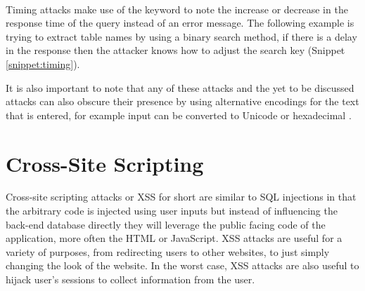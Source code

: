 \begin{codesnippet}
	\vspace{0.25in}
	\noindent
	\\
	\label{snippet:inference}
	\vspace{0.25in}
\end{codesnippet}

Timing attacks make use of the  keyword to note the increase or decrease in the response time of the query instead of an error message.  The following example is trying to extract table names by using a binary search method, if there is a delay in the response then the attacker knows how to adjust the search key (Snippet \ref{snippet:timing}).

\begin{codesnippet}
	\vspace{0.25in}
	\noindent
	\label{snippet:timing}
	\vspace{0.25in}
\end{codesnippet}

It is also important to note that any of these attacks and the yet to be discussed attacks can also obscure their presence by using alternative encodings for the text that is entered, for example input can be converted to Unicode or hexadecimal \cite{aClassificationOfSQL}.

\section{Cross-Site Scripting}\label{sec:xssExplanation}

Cross-site scripting attacks or XSS for short are similar to SQL injections in that the arbitrary code is injected using user inputs but instead of influencing the back-end database directly they will leverage the public facing code of the application, more often the HTML or JavaScript.  XSS attacks are useful for a variety of purposes, from redirecting users to other websites, to just simply changing the look of the website.  In the worst case, XSS attacks are also useful to hijack user's sessions to collect information from the user.

